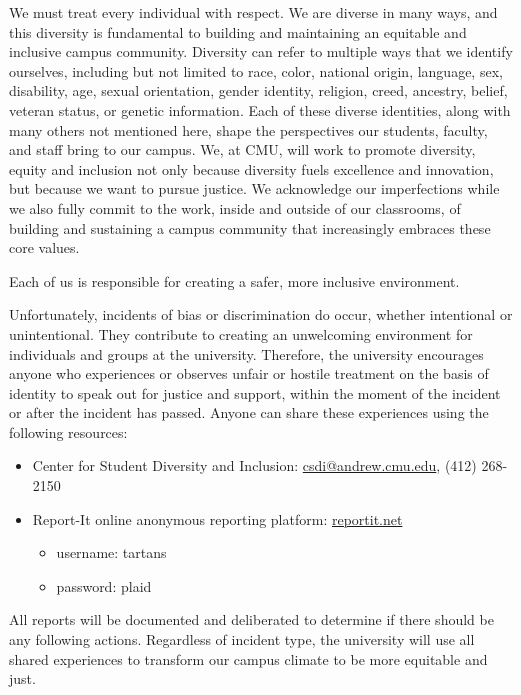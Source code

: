 \documentclass{article}
\begin{document}
We must treat every individual with respect. We are diverse in many ways, and
this diversity is fundamental to building and maintaining an equitable and
inclusive campus community. Diversity can refer to multiple ways that we
identify ourselves, including but not limited to race, color, national origin,
language, sex, disability, age, sexual orientation, gender identity, religion,
creed, ancestry, belief, veteran status, or genetic information. Each of these
diverse identities, along with many others not mentioned here, shape the
perspectives our students, faculty, and staff bring to our campus. We, at CMU,
will work to promote diversity, equity and inclusion not only because diversity
fuels excellence and innovation, but because we want to pursue justice. We
acknowledge our imperfections while we also fully commit to the work, inside and
outside of our classrooms, of building and sustaining a campus community that
increasingly embraces these core values.

Each of us is responsible for creating a safer, more inclusive environment.

Unfortunately, incidents of bias or discrimination do occur, whether intentional
or unintentional. They contribute to creating an unwelcoming environment for
individuals and groups at the university. Therefore, the university encourages
anyone who experiences or observes unfair or hostile treatment on the basis of
identity to speak out for justice and support, within the moment of the incident
or after the incident has passed. Anyone can share these experiences using the
following resources:

\begin{itemize}
    \item Center for Student Diversity and Inclusion: 
        \href{mailto:csdi@andrew.cmu.edu}{csdi@andrew.cmu.edu},
        (412) 268-2150
    \item Report-It online anonymous reporting platform: \url{reportit.net}
    \begin{itemize}
        \item username: tartans
        \item password: plaid
    \end{itemize}
\end{itemize}

All reports will be documented and deliberated to determine if there should be
any following actions. Regardless of incident type, the university will use all
shared experiences to transform our campus climate to be more equitable and
just.

\end{document}
